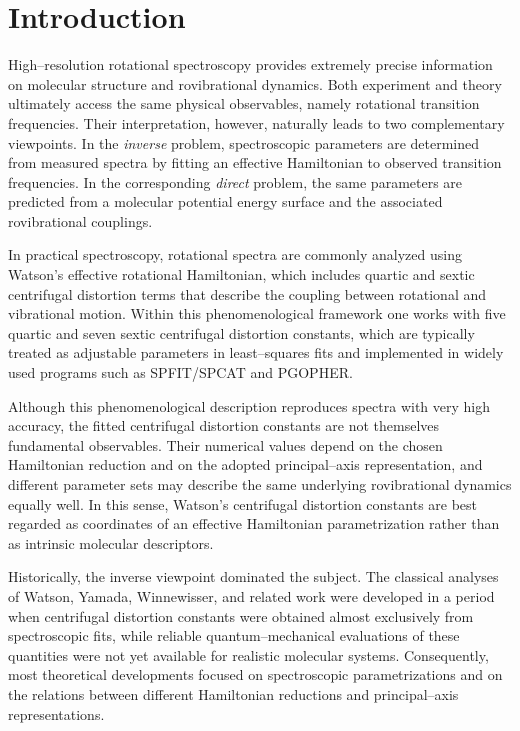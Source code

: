 \section{Introduction}

High--resolution rotational spectroscopy provides extremely precise
information on molecular structure and rovibrational dynamics.
\cite{TownesSchawlow1955,GordyCook1984,BunkerJensen2005}
Both experiment and theory ultimately access the same physical
observables, namely rotational transition frequencies. Their
interpretation, however, naturally leads to two complementary
viewpoints. In the \emph{inverse} problem, spectroscopic parameters are
determined from measured spectra by fitting an effective Hamiltonian
to observed transition frequencies.\cite{GordyCook1984,TownesSchawlow1955}
In the corresponding \emph{direct} problem, the same parameters are
predicted from a molecular potential energy surface and the associated
rovibrational couplings.\cite{Dinu2022}

In practical spectroscopy, rotational spectra are commonly analyzed
using Watson's effective rotational Hamiltonian,\cite{Watson1968,Watson1977}
which includes quartic and sextic centrifugal distortion terms that
describe the coupling between rotational and vibrational motion.
Within this phenomenological framework one works with five quartic and
seven sextic centrifugal distortion constants, which are typically
treated as adjustable parameters in least--squares fits and
implemented in widely used programs such as SPFIT/SPCAT and
PGOPHER.\cite{Pickett1991,Western2017}

Although this phenomenological description reproduces spectra with
very high accuracy, the fitted centrifugal distortion constants are
not themselves fundamental observables. Their numerical values depend
on the chosen Hamiltonian reduction and on the adopted principal--axis
representation, and different parameter sets may describe the same
underlying rovibrational dynamics equally well. In this sense,
Watson's centrifugal distortion constants are best regarded as
coordinates of an effective Hamiltonian parametrization rather than
as intrinsic molecular descriptors.

Historically, the inverse viewpoint dominated the subject. The
classical analyses of Watson, Yamada, Winnewisser, and related work
were developed in a period when centrifugal distortion constants were
obtained almost exclusively from spectroscopic fits, while reliable
quantum--mechanical evaluations of these quantities were not yet
available for realistic molecular systems. Consequently, most
theoretical developments focused on spectroscopic parametrizations and
on the relations between different Hamiltonian reductions and
principal--axis representations.

